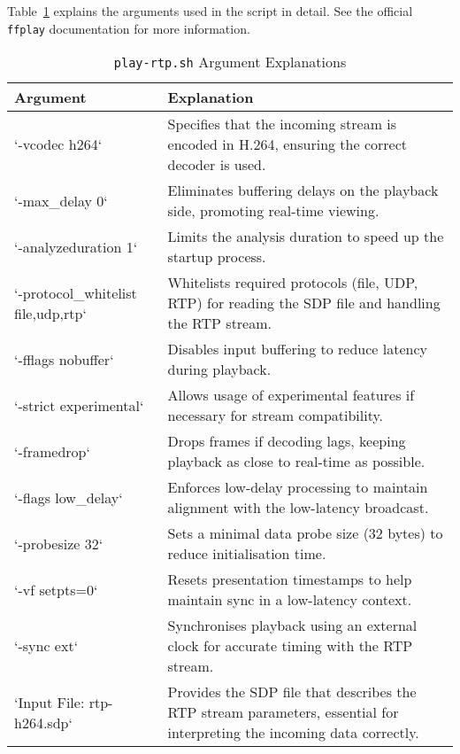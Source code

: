 Table~\ref{tab:play-args} explains the arguments used in the script in detail. See the official \texttt{ffplay} documentation for more information\cite{ffplayDocumentation}.
\begin{table}[!ht]
    \centering
    \begin{tabular}{|p{5cm}|p{10cm}|}
    \hline
        Argument & Explanation \\ \hline
        `-vcodec h264` & Specifies that the incoming stream is encoded in H.264, ensuring the correct decoder is used. \\ \hline
        `-max\_delay 0` & Eliminates buffering delays on the playback side, promoting real-time viewing. \\ \hline
        `-analyzeduration 1` & Limits the analysis duration to speed up the startup process. \\ \hline
        `-protocol\_whitelist file,udp,rtp` & Whitelists required protocols (file, UDP, RTP) for reading the SDP file and handling the RTP stream. \\ \hline
        `-fflags nobuffer` & Disables input buffering to reduce latency during playback. \\ \hline
        `-strict experimental` & Allows usage of experimental features if necessary for stream compatibility. \\ \hline
        `-framedrop` & Drops frames if decoding lags, keeping playback as close to real-time as possible. \\ \hline
        `-flags low\_delay` & Enforces low-delay processing to maintain alignment with the low-latency broadcast. \\ \hline
        `-probesize 32` & Sets a minimal data probe size (32 bytes) to reduce initialisation time. \\ \hline
        `-vf setpts=0` & Resets presentation timestamps to help maintain sync in a low-latency context. \\ \hline
        `-sync ext` & Synchronises playback using an external clock for accurate timing with the RTP stream. \\ \hline
        `Input File: rtp-h264.sdp` & Provides the SDP file that describes the RTP stream parameters, essential for interpreting the incoming data correctly. \\ \hline
    \end{tabular}
\caption{\texttt{play-rtp.sh} Argument Explanations}
    \label{tab:play-args}

\end{table}




